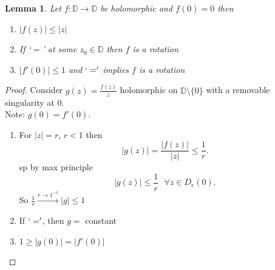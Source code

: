 \documentclass[a4paper]{article}
\newtheorem{lem}[thm]{Lemma}
\begin{document}
\begin{lem}
    Let $f:\mathbb{D}\to \mathbb{D}$ be holomorphic and $f(0)=0$ then 
    \begin{enumerate}
        \item $|f(z)|\leq |z|$
        \item If `$=$' at some $z_0\in \mathbb{D}$ then $f$ is a rotation 
        \item $|f'(0)|\leq 1$ and $`='$ implies $f$ is a rotation
    \end{enumerate}
\end{lem}
\begin{proof}
    Consider $g(z)=\frac{f(z)}{z}$ holomorphic on $\mathbb{D}\setminus \{0\}$ with a removable singularity at $0$. \\
    Note: $g(0)=f'(0)$. 
    \begin{enumerate}
        \item For $|z|=r$, $r<1$ then 
        \[
        |g(z)|=\frac{|f(z)|}{|z|}\leq \frac{1}{r}
        .\] 
        sp by max principle 
        \[
        |g(z)|\leq \frac{1}{r} \text{ } \forall z\in D_r(0)
        .\] 
        So $\frac{1}{r}\xrightarrow{r\to 1^{-1}} |g|\leq 1$
        \item If $`='$, then $g=$ constant 
        \item $1\geq |g(0)|=|f'(0)|$ 
    \end{enumerate}
\end{proof}
\newpage
\end{document}
